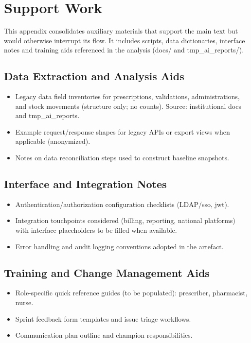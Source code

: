\chapter{Support Work}
\label{app:support_work}

This appendix consolidates auxiliary materials that support the main text but would otherwise interrupt its flow. It includes scripts, data dictionaries, interface notes and training aids referenced in the analysis (docs/ and tmp\_ai\_reports/).

\section{Data Extraction and Analysis Aids}
\begin{itemize}
    \item Legacy data field inventories for prescriptions, validations, administrations, and stock movements (structure only; no counts). Source: institutional docs and tmp\_ai\_reports.
    \item Example request/response shapes for legacy APIs or export views when applicable (anonymized).
    \item Notes on data reconciliation steps used to construct baseline snapshots.
\end{itemize}

\section{Interface and Integration Notes}
\begin{itemize}
    \item Authentication/authorization configuration checklists (LDAP/\gls{sso}, \gls{jwt}).
    \item Integration touchpoints considered (billing, reporting, national platforms) with interface placeholders to be filled when available.
    \item Error handling and audit logging conventions adopted in the artefact.
\end{itemize}

\section{Training and Change Management Aids}
\begin{itemize}
    \item Role-specific quick reference guides (to be populated): prescriber, pharmacist, nurse.
    \item Sprint feedback form templates and issue triage workflows.
    \item Communication plan outline and champion responsibilities.
\end{itemize}